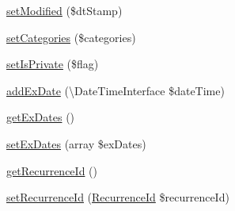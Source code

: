\begin{DoxyCompactItemize}
\item 
\mbox{\hyperlink{class_eluceo_1_1i_cal_1_1_component_1_1_event_aaebe7c920032e1ea1025db235c9d2003}{set\+Modified}} (\$dt\+Stamp)
\item 
\mbox{\hyperlink{class_eluceo_1_1i_cal_1_1_component_1_1_event_ab8e1826d0bbfa8741667e0c9c06ac186}{set\+Categories}} (\$categories)
\item 
\mbox{\hyperlink{class_eluceo_1_1i_cal_1_1_component_1_1_event_a4fb6334dcfa12640cd0a5e0014f30073}{set\+Is\+Private}} (\$flag)
\item 
\mbox{\hyperlink{class_eluceo_1_1i_cal_1_1_component_1_1_event_af5aeaa2d4977aff633e5d3d7b69e49e4}{add\+Ex\+Date}} (\textbackslash{}Date\+Time\+Interface \$date\+Time)
\item 
\mbox{\hyperlink{class_eluceo_1_1i_cal_1_1_component_1_1_event_a2809ef50254d73bbba21837f56dcad32}{get\+Ex\+Dates}} ()
\item 
\mbox{\hyperlink{class_eluceo_1_1i_cal_1_1_component_1_1_event_a7a5e86f13809c946c761268c804f139a}{set\+Ex\+Dates}} (array \$ex\+Dates)
\item 
\mbox{\hyperlink{class_eluceo_1_1i_cal_1_1_component_1_1_event_aa76dff4b92d0a324f6c553ec08b50451}{get\+Recurrence\+Id}} ()
\item 
\mbox{\hyperlink{class_eluceo_1_1i_cal_1_1_component_1_1_event_a58f917ab89985fa449ad2cff85477d0a}{set\+Recurrence\+Id}} (\mbox{\hyperlink{class_eluceo_1_1i_cal_1_1_property_1_1_event_1_1_recurrence_id}{Recurrence\+Id}} \$recurrence\+Id)
\end{DoxyCompactItemize}
